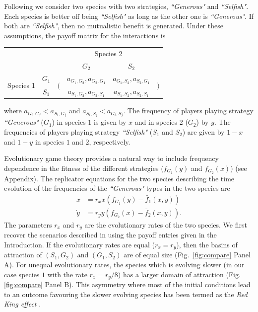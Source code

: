 \documentclass[a4paper]{scrartcl}
\begin{document}
Following \citep{bergstrom:2003jf} we consider two species with two strategies, \textit{``Generous"} and \textit{``Selfish"}.
Each species is better off being \textit{``Selfish"} as long as the other one is \textit{``Generous"}.
If both are \textit{``Selfish"}, then no mutualistic benefit is generated.
Under these assumptions, the payoff matrix for the interactions is
%
\begin{center}
\begin{tabular}{cccccc}
& & & \multicolumn{2}{c}{Species 2} &\\
& & & $G_2$ & $S_2$ &\\
\multirow{2}{*}{Species 1}& $G_1$
& \multirow{2}{*}{$\bigg($} & $a_{G_1,G_2}, a_{G_2,G_1}$ & $a_{G_1,S_2}, a_{S_2,G_1}$ & \multirow{2}{*}{$\bigg)$}\\
& $S_1$ & & $a_{S_1,G_2}, a_{G_2,S_1}$ & $a_{S_1,S_2}, a_{S_2,S_1}$ &
\end{tabular}
\end{center}
%
where $a_{G_i,G_j} < a_{S_i,G_j}$ and $a_{S_i,S_j} < a_{G_i,S_j}$.
The frequency of players playing strategy \textit{``Generous"} ($G_1$) in species $1$ is given by $x$ and in species $2$ ($G_2$) by $y$.
The frequencies of players playing strategy \textit{``Selfish"} ($S_1$ and $S_2$) are given by $1-x$ and $1-y$ in species $1$ and $2$, respectively.

Evolutionary game theory provides a natural way to include frequency dependence in the fitness of the different strategies ($f_{G_1}(y)$ and $f_{G_2}(x)$) (see Appendix).
The replicator equations
for the two species describing the time evolution of the frequencies of the \textit{``Generous"} types in the two species are \citep{taylor:1978wv,hofbauer:1998mm,hofbauer:2003mm}
%
\begin{align}
\dot{x} &= r_x x \left(f_{G_1}(y) -  \bar{f}_1(x,y) \right) \nonumber \\
\dot{y} &= r_y y \left(f_{G_2}(x) -  \bar{f}_2(x,y) \right).
\label{eq:orirepeqs}
\end{align}
%
The parameters $r_x$ and $r_y$ are the evolutionary rates of the two species.
We first recover the scenarios described in \citep{bergstrom:2003jf} using the payoff entries given in the Introduction.
If the evolutionary rates are equal ($r_x=r_y$), then the basins of attraction of $(S_1, G_2)$ and $(G_1, S_2)$ are of equal size (Fig.\ \ref{fig:compare} Panel A).
For unequal evolutionary rates, the species which is evolving slower (in our case species $1$ with the rate $r_x=r_y/8$) has a larger domain of attraction (Fig. \ref{fig:compare} Panel B).
This asymmetry where most of the initial conditions lead to an outcome favouring the slower evolving species  has been termed as the \textit{Red King effect} \citep{bergstrom:2003jf}.
\end{document}

